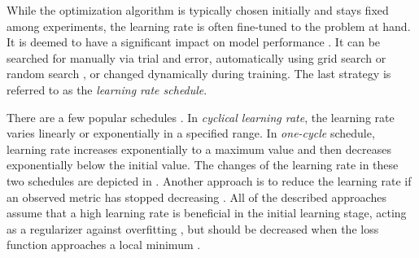 While the optimization algorithm is typically chosen initially and stays fixed among experiments, the learning rate is often fine-tuned to the problem at hand. It is deemed to have a significant impact on model performance \cite{Goodfellow-et-al-2016}. It can be searched for manually via trial and error, automatically using grid search or random search \cite{Goodfellow-et-al-2016}, or changed dynamically during training. The last strategy is referred to as the \emph{learning rate schedule}.

There are a few popular schedules \cite{Smith2018}. In \emph{cyclical learning rate}, the learning rate varies linearly or exponentially in a specified range. In \emph{one-cycle} schedule, learning rate increases exponentially to a maximum value and then decreases exponentially below the initial value. The changes of the learning rate in these two schedules are depicted in . Another approach is to reduce the learning rate if an observed metric has stopped decreasing \cite{Pytorch}. All of the described approaches assume that a high learning rate is beneficial in the initial learning stage, acting as a regularizer against overfitting \cite{Smith2018}, but should be decreased when the loss function approaches a local minimum \cite{Goodfellow-et-al-2016}. 

